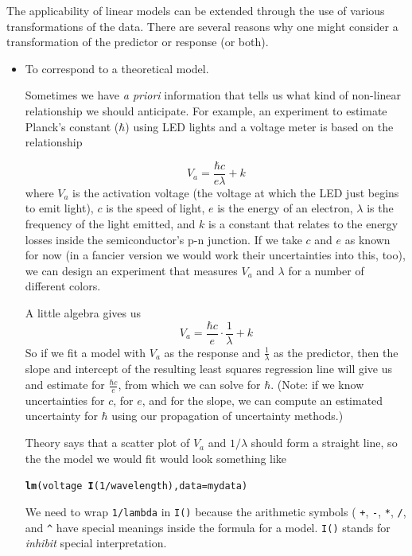 \documentclass[twoside]{book}\usepackage[]{graphicx}\usepackage[]{xcolor}
\makeatletter
\newcommand{\hlnum}[1]{\textcolor[rgb]{0.686,0.059,0.569}{#1}}%
\newcommand{\hlopt}[1]{\textcolor[rgb]{0,0,0}{#1}}%
\newcommand{\hlstd}[1]{\textcolor[rgb]{0.345,0.345,0.345}{#1}}%
\newcommand{\hlkwc}[1]{\textcolor[rgb]{0.333,0.667,0.333}{#1}}%
\newcommand{\hlkwd}[1]{\textcolor[rgb]{0.737,0.353,0.396}{\textbf{#1}}}%
\newenvironment{kframe}{%
 \def\at@end@of@kframe{}%
 \ifinner\ifhmode%
  \def\at@end@of@kframe{\end{minipage}}%
  \begin{minipage}{\columnwidth}%
 \fi\fi%
 \def\FrameCommand##1{\hskip\@totalleftmargin \hskip-\fboxsep
 \colorbox{shadecolor}{##1}\hskip-\fboxsep
     \hskip-\linewidth \hskip-\@totalleftmargin \hskip\columnwidth}%
 \MakeFramed {\advance\hsize-\width
   \@totalleftmargin\z@ \linewidth\hsize
   \@setminipage}}%
 {\par\unskip\endMakeFramed%
 \at@end@of@kframe}
\newenvironment{knitrout}{}{} %
\renewcommand{\code}[1]{{\color{blue!80!black}\texttt{#1}}}
\newcounter{example}[section]
\makeatother
\begin{document}
The applicability of linear models can be extended through the use of 
various transformations of the data.  
There are several reasons why one might consider a transformation of
the predictor or response (or both).

\begin{itemize}
  \item To correspond to a theoretical model.

	Sometimes we have \emph{a priori} information that tells us what 
	kind of non-linear relationship we should anticipate.  
	For example, an experiment to estimate Planck's constant ($\hbar$) using 
	LED lights and a voltage meter is based on the relationship
	
	\[
	V_a = \frac{\hbar c }{e \lambda} + k
	\]
	where $V_a$ is the activation voltage (the voltage at which the LED just begins to emit
	light), $c$ is the speed of light, $e$ is the energy of an electron, $\lambda$ is the 
	frequency of the light emitted, and $k$ is a constant that relates to the energy 
	losses inside the semiconductor’s p-n junction.
	If we take $c$ and $e$ as known for now (in a fancier version we would work their
	uncertainties into this, too), we can design an experiment that measures $V_a$
	and $\lambda$ for a number of different colors.
	
	A little algebra gives us
	\[
	V_a = \frac{\hbar c }{e} \cdot \frac{1}{\lambda} + k
	\]
	So if we fit a model with $V_a$ as the response and $\frac{1}{\lambda}$ as the predictor,
	then the slope and intercept of the resulting least squares regression line will 
	give us and estimate for $\frac{\hbar c }{e}$, from which we can solve for $\hbar$.
	(Note: if we know uncertainties for $c$, for $e$, and for the slope, we can compute
	an estimated uncertainty for $\hbar$ using our propagation of uncertainty methods.)

  Theory says that a scatter plot of $V_a$ and $1/\lambda$ should form a straight line,
  so the the model we would fit would look something like
\begin{knitrout}
\color{fgcolor}\begin{kframe}
\begin{alltt}
\hlkwd{lm}\hlstd{(voltage} \hlopt{~} \hlkwd{I}\hlstd{(}\hlnum{1}\hlopt{/}\hlstd{wavelength),} \hlkwc{data} \hlstd{= mydata)}
\end{alltt}
\end{kframe}
\end{knitrout}
\noindent
We need to wrap \code{1/lambda} in \code{I()} because the arithmetic symbols 
(
\code{+},
\code{-},
\code{*},
\code{/},
and 
\verb!^!
have special meanings inside the formula for a model. 
\code{I()} stands for \emph{inhibit} special interpretation.


\end{itemize}
\end{document}
